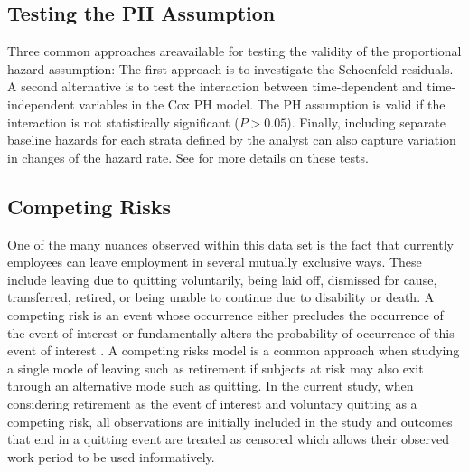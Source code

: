 \documentclass[12pt,letterpaper]{article}
\begin{document}
\subsection{Testing the PH Assumption}
Three common approaches areavailable for testing the validity of the proportional hazard assumption: The first approach is to investigate the Schoenfeld residuals. A second alternative is to test the interaction between time-dependent and time-independent variables in the Cox PH model. The PH assumption is valid if the interaction is not statistically significant ($P>0.05$). Finally, including separate baseline hazards for each strata defined by the analyst can also capture variation in changes of the hazard rate. See \citet{allison2010,collett2015} for more details on these tests.


\subsection{Competing Risks}
One of the many nuances observed within this data set is the fact that currently employees can leave employment in several mutually exclusive ways.  These include leaving due to quitting voluntarily, being laid off, dismissed for cause, transferred, retired, or being unable to continue due to disability or death. A competing risk is an event whose occurrence either precludes the occurrence of the event of interest or fundamentally alters the probability of occurrence of this event of interest \citep{tableman2003}.  A competing risks model is a common approach when studying a single mode of leaving such as retirement if subjects at risk may also exit through an alternative mode such as quitting.  In the current study, when considering retirement as the event of interest and voluntary quitting as a competing risk, all observations are initially included in the study and outcomes that end in a quitting event are treated as censored which allows their observed work period to be used informatively.
\end{document}
